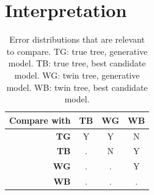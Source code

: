 \documentclass{article}
\begin{document}
\section{Interpretation}

\begin{table}
  \begin{tabular}{ | r | c | c | c | }
    \hline
    \textbf{Compare with} & \textbf{TB} & \textbf{WG} & \textbf{WB} \\ 
    \hline
    \textbf{TG} & Y & Y & N \\
    \textbf{TB} & . & N & Y \\
    \textbf{WG} & . & . & Y \\
    \textbf{WB} & . & . & . \\
    \hline
  \end{tabular}
  \caption{
    Error distributions that are relevant to compare.
    TG: true tree, generative model.
    TB: true tree, best candidate model.
    WG: twin tree, generative model.
    WB: twin tree, best candidate model.
  }
  \label{tab:relevant_comparisions}
\end{table}
\end{document}

